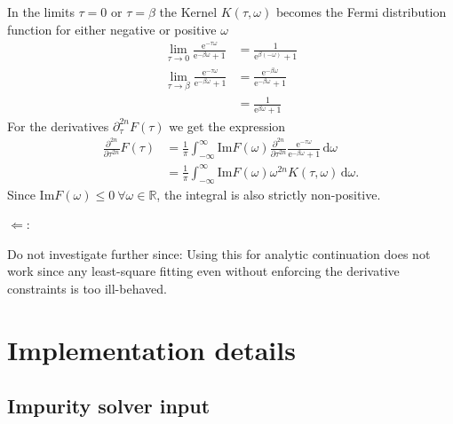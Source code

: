 \documentclass[12pt,a4paper]{scrartcl}
\numberwithin{equation}{section}
\begin{document}
In the limits $\tau=0$ or $\tau = \beta$ the Kernel $K(\tau,\omega)$ becomes the Fermi
distribution function for either negative or positive $\omega$
\begin{align}
 \lim\limits_{\tau\rightarrow 0}
 \frac{\mathrm{e}^{-\tau\omega}}{\mathrm{e}^{-\beta\omega}+1} 
 &=  \frac{1}{\mathrm{e}^{\beta(-\omega)}+1} \\
  \lim\limits_{\tau\rightarrow \beta}
 \frac{\mathrm{e}^{-\tau\omega}}{\mathrm{e}^{-\beta\omega}+1} 
 &= \frac{\mathrm{e}^{-\beta\omega}}{\mathrm{e}^{-\beta\omega}+1} \\
 &= \frac{1}{\mathrm{e}^{\beta\omega}+1}
\end{align}
For the derivatives $\partial_{\tau}^{2n} F(\tau) $ 
we get the expression
\begin{align}
\frac{\partial^{2n} }{\partial \tau^{2n}} F(\tau)
&=\frac{1}{\pi} \int_{-\infty}^{\infty} \mathrm{Im}F(\omega) 
 \frac{\partial^{2n} }{\partial \tau^{2n}}
          \frac{\mathrm{e}^{-\tau\omega}}{\mathrm{e}^{-\beta\omega}+1} \, \mathrm{d}\omega   \\
%             
&= \frac{1}{\pi} \int_{-\infty}^{\infty} \mathrm{Im}F(\omega) 
\omega^{2n}   K(\tau,\omega) \, \mathrm{d}\omega.
\end{align}
Since $\mathrm{Im}F(\omega) \leq 0 \  \forall \omega \in \mathbb{R}$,
the integral is also strictly non-positive.

\bigskip

$\Leftarrow$:

Do not investigate further since:
Using this for analytic continuation
does not work since any least-square fitting even without enforcing
the derivative constraints is too ill-behaved.





\section{Implementation details}

\subsection{Impurity solver input}
\end{document}
